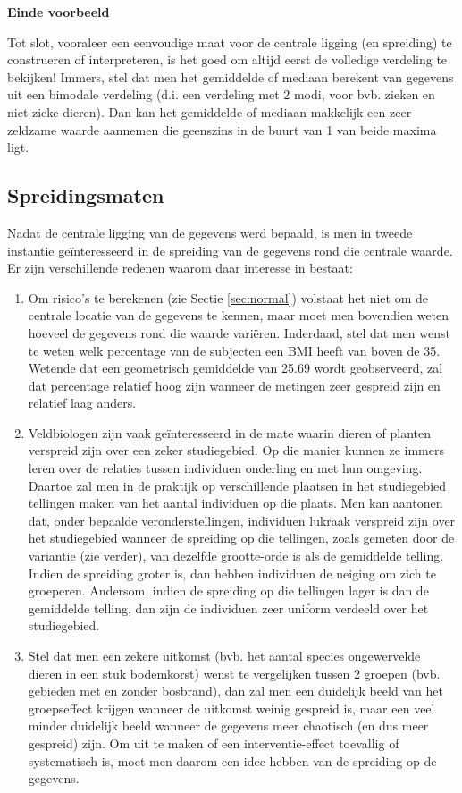 \documentclass[
  12pt,dutch,coursenotes]{book}
\providecommand{\tightlist}{%
  \setlength{\itemsep}{0pt}\setlength{\parskip}{0pt}}
\theoremstyle{definition}
\theoremstyle{definition}
\theoremstyle{definition}
\theoremstyle{remark}
\begin{document}
\textbf{Einde voorbeeld}

Tot slot, vooraleer een eenvoudige maat voor de centrale ligging (en
spreiding) te construeren of interpreteren, is het goed om altijd eerst de
volledige verdeling te bekijken! Immers, stel dat men het gemiddelde of
mediaan berekent van gegevens uit een bimodale verdeling (d.i. een verdeling
met 2 modi, voor bvb. zieken en niet-zieke dieren). Dan kan het gemiddelde of
mediaan makkelijk een zeer zeldzame waarde aannemen die geenszins in de
buurt van 1 van beide maxima ligt.

\hypertarget{subsec:spreiding}{%
\subsection{Spreidingsmaten}\label{subsec:spreiding}}

Nadat de centrale ligging van de gegevens werd bepaald, is men in tweede
instantie geïnteresseerd in de spreiding van de gegevens rond
die centrale waarde. Er zijn verschillende redenen waarom daar interesse in bestaat:

\begin{enumerate}
\def\labelenumi{\arabic{enumi}.}
\tightlist
\item
  Om risico's te berekenen (zie Sectie \ref{sec:normal}) volstaat het niet om de centrale locatie van de gegevens te kennen, maar moet men bovendien weten hoeveel de gegevens rond die waarde variëren. Inderdaad, stel dat men wenst te weten welk percentage van de subjecten een BMI heeft van boven de 35. Wetende dat een geometrisch gemiddelde van 25.69 wordt geobserveerd, zal dat percentage relatief hoog zijn wanneer de metingen zeer gespreid zijn en relatief laag anders.
\item
  Veldbiologen zijn vaak geïnteresseerd in de mate waarin dieren of planten verspreid zijn over een zeker studiegebied. Op die manier kunnen ze immers leren over de relaties tussen individuen onderling en met hun omgeving. Daartoe zal men in de praktijk op verschillende plaatsen in het studiegebied tellingen maken van het aantal individuen op die plaats. Men kan aantonen dat, onder bepaalde veronderstellingen, individuen lukraak verspreid zijn over het studiegebied wanneer de spreiding op die tellingen, zoals gemeten door de variantie (zie verder), van dezelfde grootte-orde is als de gemiddelde telling. Indien de spreiding groter is, dan hebben individuen de neiging om zich te groeperen. Andersom, indien de spreiding op die tellingen lager is dan de gemiddelde telling, dan zijn de individuen zeer uniform verdeeld over het studiegebied.
\item
  Stel dat men een zekere uitkomst (bvb. het aantal species ongewervelde dieren in een stuk bodemkorst) wenst te vergelijken tussen 2 groepen (bvb. gebieden met en zonder bosbrand), dan zal men een duidelijk beeld van het groepseffect krijgen wanneer de uitkomst weinig gespreid is, maar een veel minder duidelijk beeld wanneer de gegevens meer chaotisch (en dus meer gespreid) zijn. Om uit te maken of een interventie-effect toevallig of systematisch is, moet men daarom een idee hebben van de spreiding op de gegevens.
\end{enumerate}
\end{document}
